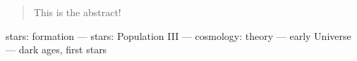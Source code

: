 \begin{abstract}
This is the abstract!
\end{abstract}

\begin{keywords}
stars: formation --- stars: Population III --- cosmology: theory --- early Universe --- dark ages, first stars
\end{keywords}